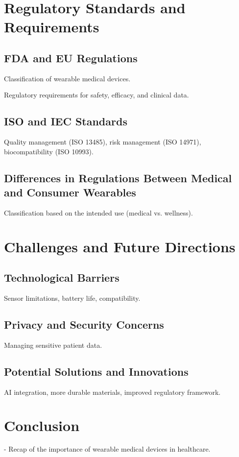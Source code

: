 \documentclass[journal]{IEEEtran}
\begin{document}
\section{Regulatory Standards and Requirements}
\subsection{FDA and EU Regulations}
Classification of wearable medical devices.

Regulatory requirements for safety, efficacy, and clinical data.
\subsection{ISO and IEC Standards}
Quality management (ISO 13485), risk management (ISO 14971), biocompatibility (ISO 10993).

\subsection{Differences in Regulations Between Medical and Consumer Wearables}
Classification based on the intended use (medical vs. wellness).

\section{Challenges and Future Directions}
\subsection{Technological Barriers}
Sensor limitations, battery life, compatibility.

\subsection{Privacy and Security Concerns}
Managing sensitive patient data.

\subsection{Potential Solutions and Innovations}
AI integration, more durable materials, improved regulatory framework.




\section{Conclusion}
- Recap of the importance of wearable medical devices in healthcare.
\end{document}
